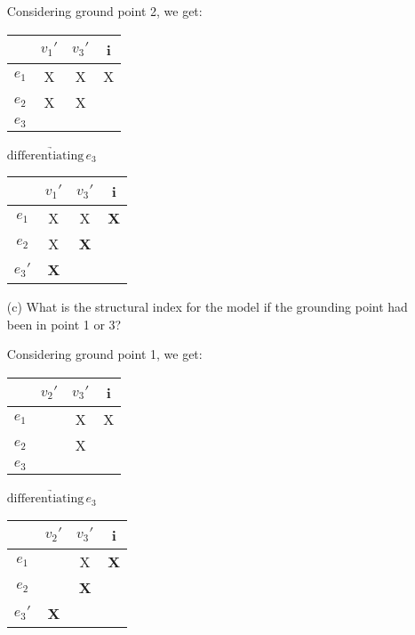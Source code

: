 \begin{enumerate}
	Considering ground point 2, we get:
	\begin{center}
		\begin{tabular}{c|c c c}
			& $v_1'$ & $v_3'$ & i \\
			\hline
			$e_1$ & X & X & X \\
			$e_2$ & X & X &  \\
			$e_3$ &  &  &  \\
		\end{tabular} $\underrightarrow{\text{differentiating}\,e_3}$
	\begin{tabular}{c|c c c}
		& $v_1'$ & $v_3'$ & i \\
		\hline
		$e_1$ & X & X & \textbf{X} \\
		$e_2$ & X & \textbf{X} &  \\
		$e_3'$ & \textbf{X} &  &  \\
	\end{tabular} 
	\end{center}

	
	\item[(c)] What is the structural index for the model if the grounding point had been
	in point 1 or 3?
	
	Considering ground point 1, we get:
	\begin{center}
		\begin{tabular}{c|c c c}
			& $v_2'$ & $v_3'$ & i \\
			\hline
			$e_1$ & & X & X \\
			$e_2$ & & X &  \\
			$e_3$ & & &  \\
		\end{tabular} $\underrightarrow{\text{differentiating}\,e_3}$
	\begin{tabular}{c|c c c}
		& $v_2'$ & $v_3'$ & i \\
		\hline
		$e_1$ & & X & \textbf{X} \\
		$e_2$ & & \textbf{X} &  \\
		$e_3'$ & \textbf{X} & &  \\
	\end{tabular}
	\end{center}
	
	

\end{enumerate}
